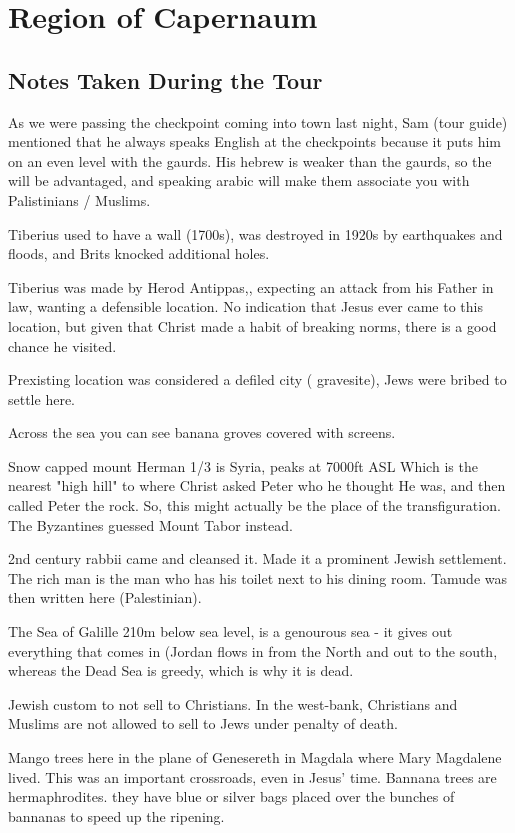 \documentclass[letterpaper]{report}
\begin{document}
\clearpage
\section{Region of Capernaum}
\begin{multicols}{2}
	\mbox{}
\end{multicols}
\subsection{Notes Taken During the Tour}
As we were passing the checkpoint coming into town last night, Sam (tour guide) mentioned that he always speaks English at the checkpoints because it puts him on an even level with the gaurds. His hebrew is weaker than the gaurds, so the will be advantaged, and speaking arabic will make them associate you with Palistinians / Muslims.

Tiberius used to have a wall (1700s), was destroyed in 1920s by earthquakes and floods, and Brits knocked additional holes.

Tiberius was made by Herod Antippas,, expecting an attack from his Father in law, wanting a defensible location.
No indication that Jesus ever came to this location, but given that Christ made a habit of breaking norms, there is a good chance he visited.

Prexisting location was considered a defiled city ( gravesite), Jews were bribed to settle here.

Across the sea you can see banana groves covered with screens.

Snow capped mount Herman 1/3 is Syria, peaks at 7000ft ASL Which is the nearest "high hill" to where Christ asked Peter who he thought He was, and then called Peter the rock. So, this might actually be the place of the transfiguration. The Byzantines guessed Mount Tabor instead.

2nd century rabbii came and cleansed it. Made it a prominent Jewish settlement. 
The rich man is the man who has his toilet next to his dining room.
Tamude was then written here (Palestinian).

The Sea of Galille 210m below sea level, is a genourous sea - it gives out everything that comes in (Jordan flows in from the North and out to the south, whereas the Dead Sea is greedy, which is why it is dead.

Jewish custom to not sell to Christians.
In the west-bank, Christians and Muslims are not allowed to sell to Jews under penalty of death.

Mango trees here in the plane of Genesereth in Magdala where Mary Magdalene lived.
This was an important crossroads, even in Jesus' time. Bannana trees are hermaphrodites. they have blue or silver bags placed over the bunches of bannanas to speed up the ripening.
\end{document}

